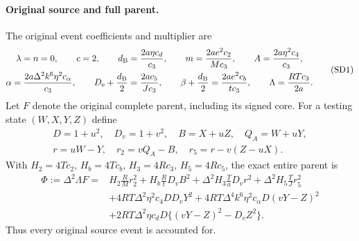 \paragraph{Original source and full parent.}
The original event coefficients and multiplier are
\[
\begin{gathered}
\lambda=n=0,\qquad c=2,\qquad
 d_{\rm B}=\frac{2a\eta c_d}{c_3},\qquad
 m=\frac{2ae^2c_2}{Mc_3},\qquad A=\frac{2a\eta^2c_4}{c_3},\\
\alpha=\frac{2a\Delta^2k^6\eta^2c_\alpha}{c_3},\qquad
D_{\rm e}+\frac{d_{\rm B}}2=\frac{2ac_5}{Jc_3},\qquad
\beta+\frac{d_{\rm B}}2=\frac{2ae^2c_b}{tc_3},\qquad
\Lambda=\frac{RTc_3}{2a}.
\end{gathered}                                                    \tag{SD1}
\]
Let $F$ denote the original complete parent, including its signed core.
For a testing state $(W,X,Y,Z)$ define
\[
\begin{gathered}
 D=1+u^2,\quad D_v=1+v^2,\quad B=X+uZ,\quad Q_A=W+uY,\\
 r=uW-Y,\quad r_2=vQ_A-B,\quad r_5=r-v(Z-uX).
\end{gathered}
\]
With $H_2=4Tc_2$, $H_b=4Tc_b$, $H_3=4Rc_3$, $H_5=4Rc_5$,
the exact entire parent is
\begin{align*}
\Phi:=\Delta^2\Lambda F={}&H_2\frac RM r_2^2
 +H_b\frac RtD_v B^2+\Delta^2H_3\frac TaD_vr^2
 +\Delta^2H_5\frac TJr_5^2\\
 &+4RT\Delta^2\eta^2c_4DD_vY^2
 +4RT\Delta^4k^6\eta^2c_\alpha D(vY-Z)^2\\
 &+2RT\Delta^2\eta c_dD\{(vY-Z)^2-D_vZ^2\}.
                                                               \tag{SD2}
\end{align*}
Thus every original source event is accounted for.

